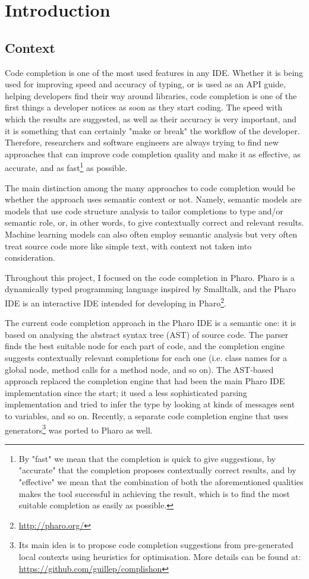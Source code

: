\chapter{Introduction}
\label{chap:Introduction}

\section{Context}
\label{sec:Introduction-Context}
Code completion is one of the most used features in any IDE. Whether it is being used for improving speed and accuracy of typing, or is used as an API guide, helping developers find their way around libraries, code completion is one of the first things a developer notices as soon as they start coding. The speed with which the results are suggested, as well as their accuracy is very important, and it is something that can certainly "make or break" the workflow of the developer. Therefore, researchers and software engineers are always trying to find new approaches that can improve code completion quality and make it as effective, as accurate, and as fast\footnote{By "fast" we mean that the completion is quick to give suggestions, by "accurate" that the completion proposes contextually correct results, and by "effective" we mean that the combination of both the aforementioned qualities makes the tool successful in achieving the result, which is to find the most suitable completion as easily as possible.} as possible.

The main distinction among the many approaches to code completion would be whether the approach uses semantic context or not. Namely, semantic models are models that use code structure analysis to tailor completions to type and/or semantic role, or, in other words, to give contextually correct and relevant results. Machine learning models can also often employ semantic analysis but very often treat source code more like simple text, with context not taken into consideration.

Throughout this project, I focused on the code completion in Pharo. Pharo is a dynamically typed programming language inspired by Smalltalk, and the Pharo IDE is an interactive IDE intended for developing in Pharo\footnote{\url{http://pharo.org/}}.

The current code completion approach in the Pharo IDE is a semantic one: it is based on analysing the abstract syntax tree (AST) of source code. The parser finds the best suitable node for each part of code, and the completion engine suggests contextually relevant completions for each one (i.e. class names for a global node, method calls for a method node, and so on). The AST-based approach replaced the completion engine that had been the main Pharo IDE implementation since the start; it used a less sophisticated parsing implementation and tried to infer the type by looking at kinds of messages sent to variables, and so on. Recently, a separate code completion engine that uses generators\footnote{Its main idea is to propose code completion suggestions from pre-generated local contexts using heuristics for optimisation. More details can be found at: \url{https://github.com/guillep/complishon}} was ported to Pharo as well.

